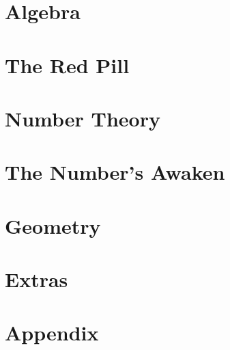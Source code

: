 \documentclass{maaprb}
\begin{document}
\part{Algebra}




\part{The Red Pill}








\part{Number Theory}





\part{The Number's Awaken}



\part{Geometry}


\part{Extras}


\backmatter

\appendix
\part{Appendix}





\clearpage
\end{document}

